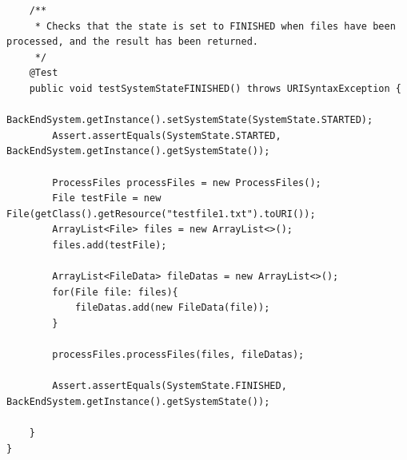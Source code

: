 \begin{lstlisting}
    /**
     * Checks that the state is set to FINISHED when files have been processed, and the result has been returned.
     */
    @Test
    public void testSystemStateFINISHED() throws URISyntaxException {
        BackEndSystem.getInstance().setSystemState(SystemState.STARTED);
        Assert.assertEquals(SystemState.STARTED, BackEndSystem.getInstance().getSystemState());

        ProcessFiles processFiles = new ProcessFiles();
        File testFile = new File(getClass().getResource("testfile1.txt").toURI());
        ArrayList<File> files = new ArrayList<>();
        files.add(testFile);

        ArrayList<FileData> fileDatas = new ArrayList<>();
        for(File file: files){
            fileDatas.add(new FileData(file));
        }

        processFiles.processFiles(files, fileDatas);

        Assert.assertEquals(SystemState.FINISHED, BackEndSystem.getInstance().getSystemState());

    }
}
\end{lstlisting}
